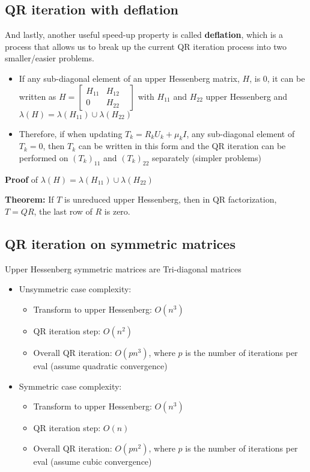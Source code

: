 \documentclass{article}
\begin{document}
\subsection{QR iteration with deflation}
And lastly, another useful speed-up property is called \textbf{deflation}, which is a process that allows us to break up the current QR iteration process into two smaller/easier problems.
\begin{itemize}
    \item If any sub-diagonal element of an upper Hessenberg matrix, $H$, is 0, it can be written as $H = \begin{bmatrix} H_{11} & H_{12} \\ 0 & H_{22} &\end{bmatrix}$ with $H_{11}$ and $H_{22}$ upper Hessenberg and $\lambda(H) = \lambda(H_{11})\cup \lambda(H_{22})$
    \item Therefore, if when updating $T_k = R_kU_k + \mu_k I$, any sub-diagonal element of $T_k = 0$, then $T_k$ can be written in this form and the QR iteration can be performed on $(T_k)_{11}$ and $(T_k)_{22}$ separately (simpler  problems)
\end{itemize}
\textbf{Proof} of $\lambda(H) = \lambda(H_{11})\cup \lambda(H_{22})$

\textbf{Theorem:} If $T$ is unreduced upper Hessenberg, then in QR factorization, $T=QR$, the last row of $R$ is zero.

\subsection{QR iteration on symmetric matrices}
Upper Hessenberg symmetric matrices are Tri-diagonal matrices
\begin{itemize}
    \item Unsymmetric case complexity:
    \begin{itemize}
        \item Transform to upper Hessenberg: $O(n^3)$
        \item QR iteration step: $O(n^2)$
        \item Overall QR iteration: $O(pn^3)$, where $p$ is the number of iterations per eval (assume quadratic convergence)
    \end{itemize}
    \item Symmetric case complexity:
    \begin{itemize}
        \item Transform to upper Hessenberg: $O(n^3)$
        \item QR iteration step: $O(n)$
        \item Overall QR iteration: $O(pn^2)$, where $p$ is the number of iterations per eval (assume cubic convergence) 
    \end{itemize}
\end{itemize}
\end{document}
